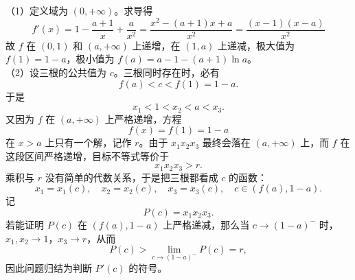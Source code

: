 \begin{solution}
（1）定义域为 $(0,+\infty)$。求导得
$$f'(x)=1-\frac{a+1}x+\frac a{x^2}=\frac{x^2-(a+1)x+a}{x^2}=\frac{(x-1)(x-a)}{x^2}$$
故 $f$ 在 $(0,1)$ 和 $(a,+\infty)$ 上递增，在 $(1,a)$ 上递减，极大值为 $f(1)=1-a$，极小值为 $f(a)=a-1-(a+1)\ln a$。\\
（2）设三根的公共值为 $c$。三根同时存在时，必有
\[
f(a)<c<f(1)=1-a.
\]
于是
\[
x_1<1<x_2<a<x_3.
\]
又因为 $f$ 在 $(a,+\infty)$ 上严格递增，方程
\[
f(x)=f(1)=1-a
\]
在 $x>a$ 上只有一个解，记作 $r$。由于 $x_1x_2x_3$ 最终会落在 $(a,+\infty)$ 上，而 $f$ 在这段区间严格递增，目标不等式等价于
\[
x_1x_2x_3>r.
\]
乘积与 $r$ 没有简单的代数关系，于是把三根都看成 $c$ 的函数：
\[x_1=x_1(c),\quad x_2=x_2(c),\quad x_3=x_3(c),\quad c\in(f(a),1-a).\]
记
\[
P(c)=x_1x_2x_3.
\]
若能证明 $P(c)$ 在 $(f(a),1-a)$ 上严格递减，那么当 $c\to(1-a)^-$ 时，$x_1,x_2\to1$，$x_3\to r$，从而
\[
P(c)> \lim_{c\to(1-a)^-}P(c)=r,
\]
因此问题归结为判断 $P'(c)$ 的符号。


\end{solution}
